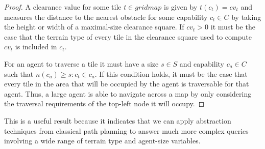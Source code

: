 \begin{proof}
A clearance value for some tile $t \in gridmap$ is given by $t(c_{t}) = cv_{t}$ and measures the distance to the nearest obstacle for some capability $c_{t} \in C$ by taking the height or width of a maximal-size clearance square. 
If $cv_{t} > 0$ it must be the case that the terrain type of every tile in the clearance square used to compute $cv_{t}$ is included in $c_{t}$.
\par \indent
For an agent to traverse a tile it must have a size $s \in S$ and capability $c_{a} \in C$ such that $n(c_{a}) \geq s : c_{t} \in c_{a}$.
If this condition holds, it must be the case that every tile in the area that will be occupied by the agent is traversable for that agent. 
Thus, a large agent is able to navigate across a map by only considering the traversal requirements of the top-left node it will occupy.
\end{proof}
This is a useful result because it indicates that we can apply abstraction techniques from classical path planning to answer much more complex queries involving a wide range of terrain type and agent-size variables.
